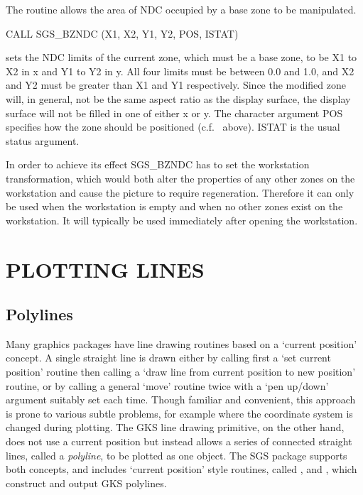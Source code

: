 \documentclass[11pt]{starlink}
\begin{document}
The routine  allows the area of NDC
occupied by a base zone to be manipulated.
\begin{terminalv}
CALL SGS_BZNDC (X1, X2, Y1, Y2, POS, ISTAT)
\end{terminalv}
sets the NDC limits of the current zone, which must be a base zone, to be X1 to
X2 in x and Y1 to Y2 in y. All four limits must be between 0.0 and 1.0, and X2
and Y2 must be greater than X1 and Y1 respectively. Since the modified zone
will, in general, not be the same aspect ratio as the display surface, the
display surface will not be filled in one of either x or y. The character
argument POS specifies how the zone should be positioned (c.f.\
above). ISTAT is the usual status argument.

In order to achieve its effect SGS\_BZNDC has to set the workstation
transformation, which would both alter the properties of any other zones
on the workstation and cause the picture to require regeneration. Therefore
it can only be used when the workstation is empty and when no other zones
exist on the workstation. It will typically be used immediately after opening
the workstation.

\section {PLOTTING LINES}\label{sec-lines}

\subsection {Polylines}
Many graphics packages have line drawing routines based on a
`current position' concept.  A single straight line
is drawn either by calling first a `set current position' routine
then calling a `draw line from current position to new
position' routine, or by calling a general `move' routine
twice with a `pen up/down' argument suitably set each time.  Though
familiar and convenient, this approach is prone to various
subtle problems, for example where the coordinate system is
changed during plotting.  The
GKS line drawing primitive,
on the other hand, does not use a current position but instead
allows a series of connected
straight lines, called a \emph{polyline},
to be plotted as one object.  The SGS package supports both
concepts, and includes `current position' style routines,
called
,
 and
,
which construct and output GKS polylines.
\end{document}
